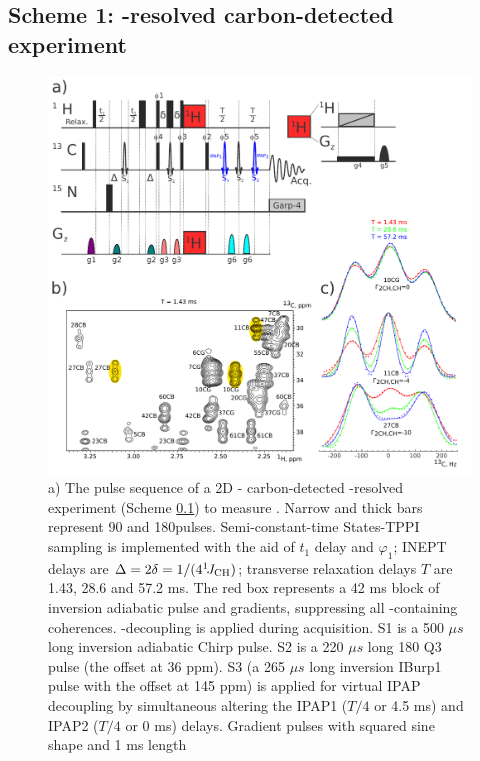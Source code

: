 \documentclass[twocolumn]{svjour3}           %
\begin{document}
\subsection{Scheme 1: \oneJch-resolved carbon-detected experiment}
\label{subseq:scheme1}

\begin{figure}
 \includegraphics[width=1.0\textwidth]{Fig1}
 \caption{
 a) The pulse sequence of a 2D \hlab-\clab{} carbon-detected 
 \oneJch-resolved experiment (Scheme \ref{subseq:scheme1}) 
 to measure \gtwoCH{}. Narrow and thick bars represent 90\degree 
 and 180\degree pulses. Semi-constant-time \hlab{} States-{TPPI} 
 sampling is implemented with the aid of $t_1$ delay and 
 $\varphi_1$; {INEPT} delays are $\Delta = 2\delta = 1/(4^1\!J_\text{CH})$; 
 transverse relaxation delays $T$ are 1.43, 28.6 and 57.2 ms. 
 The red box represents a 42 ms block of \hlab{} inversion adiabatic pulse and gradients\cite{thrippleton_elimination_2003,harris_zero-quantum_2011}, suppressing all \hlab-containing coherences. 
 \nlab-decoupling is applied during acquisition. 
 S1 is a 500 $\mu s$ long \clab{} inversion adiabatic Chirp pulse. 
 S2 is a 220 $\mu s$ long 180\degree{} Q3 pulse (the offset at 36 ppm). 
 S3 (a 265 $\mu s$ long inversion IBurp1 pulse with the offset 
 at 145 ppm) is applied for virtual IPAP decoupling by simultaneous 
 altering the IPAP1 ($T/4$ or 4.5 ms) and IPAP2 ($T/4$ or 0 ms) 
 delays. Gradient pulses with squared sine shape and 1 ms length 
}
\end{figure}
\end{document}
